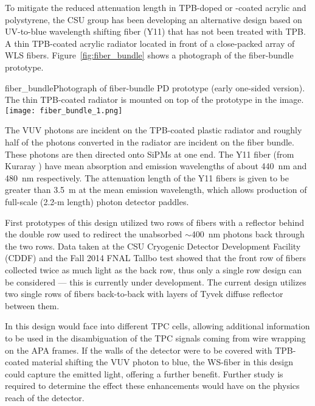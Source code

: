 To mitigate the reduced attenuation length in TPB-doped or -coated acrylic and polystyrene,
the CSU group has
been developing an alternative design based on UV-to-blue
wavelength shifting fiber (Y11) that has not been treated with TPB.  A
thin TPB-coated acrylic radiator located in front of a close-packed
array of WLS fibers. Figure~\ref{fig:fiber_bundle} shows a photograph of the
fiber-bundle prototype. 

\begin{cdrfigure}{fiber_bundle}{Photograph of fiber-bundle PD prototype (early one-sided
  version). The thin TPB-coated radiator is mounted on top of the
  prototype in the image.}
  \texttt{[image: fiber\_bundle\_1.png]}
\end{cdrfigure}


The VUV photons are incident on the TPB-coated plastic radiator and
roughly half of the photons converted in the radiator are incident on
the %
fiber bundle. %
These photons are then directed onto SiPMs at one end. The Y11 fiber (from Kuraray ) have
mean absorption and emission wavelengths of about 440~nm and 480~nm
respectively.  The attenuation length of the Y11 fibers is given to be
greater than 3.5~m at the mean emission wavelength, which allows
production of full-scale (2.2-m length) photon detector paddles.

First prototypes of this design utilized two rows of fibers with a
reflector behind the double row used to redirect the unabsorbed $\sim$400~nm photons back
through the two rows.%
Data taken at the CSU Cryogenic Detector Development
Facility (CDDF) and the Fall 2014 FNAL Tallbo test 
showed that the front row of fibers collected
twice as much light as the back row, thus
only a single row
design can be considered --- this is currently under development. The current design
utilizes two single rows of fibers back-to-back with layers of  Tyvek
diffuse reflector between them.


In this design  would face into different TPC cells, allowing additional information to be
used in the disambiguation of the TPC signals coming from wire
wrapping on the APA frames. 
If the walls of the detector were to be 
covered with TPB-coated material shifting the VUV photon to blue,
 the WS-fiber in this design could capture the emitted light, offering 
 a further benefit. Further study is
required to determine the effect these enhancements would have on the physics
reach of the detector. 

